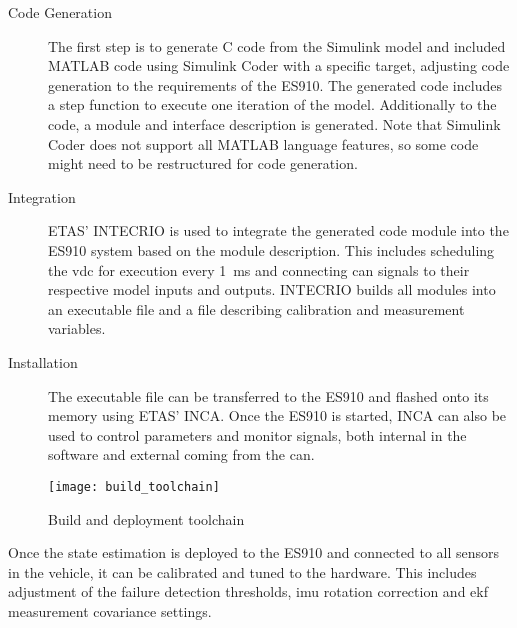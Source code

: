 \begin{description}
\item[Code Generation] The first step is to generate C code from the Simulink model and included MATLAB code using Simulink Coder with a specific target, adjusting code generation to the requirements of the ES910. The generated code includes a step function to execute one iteration of the model. Additionally to the code, a module and interface description is generated. Note that Simulink Coder does not support all MATLAB language features, so some code might need to be restructured for code generation.

\item[Integration] ETAS' INTECRIO is used to integrate the generated code module into the ES910 system based on the module description. This includes scheduling the \gls{vdc} for execution every \SI{1}{\milli\second} and connecting \gls{can} signals to their respective model inputs and outputs. INTECRIO builds all modules into an executable file and a file describing calibration and measurement variables.

\item[Installation] The executable file can be transferred to the ES910 and flashed onto its memory using ETAS' INCA. Once the ES910 is started, INCA can also be used to control parameters and monitor signals, both internal in the software and external coming from the \gls{can}.
\end{description}

\begin{figure}
	\centering
	\texttt{[image: build\_toolchain]}%
	\caption{Build and deployment toolchain}
	\label{fig:build-toolchain}
\end{figure}

Once the state estimation is deployed to the ES910 and connected to all sensors in the vehicle, it can be calibrated and tuned to the hardware. This includes adjustment of the failure detection thresholds, \gls{imu} rotation correction and \gls{ekf} measurement covariance settings.
